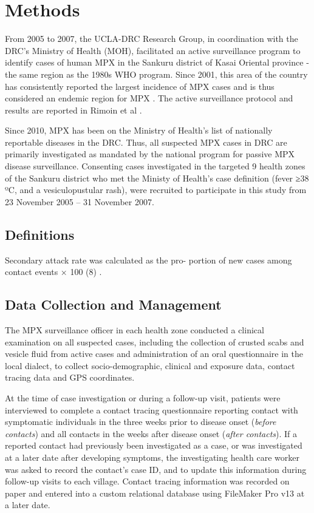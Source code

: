 \section{Methods}

From 2005 to 2007, the UCLA-DRC Research Group, in coordination with the DRC’s Ministry of Health (MOH), facilitated an active surveillance program to identify cases of human MPX in the Sankuru district of Kasai Oriental province - the same region as the 1980s WHO program. Since 2001, this area of the country has consistently reported the largest incidence of MPX cases and is thus considered an endemic region for MPX \cite{Rimoin2010}. The active surveillance protocol and results are reported in Rimoin et al \cite{Rimoin2010}.

Since 2010, MPX has been on the Ministry of Health's list of nationally reportable diseases in the DRC. Thus, all suspected MPX cases in DRC are primarily investigated as mandated by the national program for passive MPX disease surveillance. Consenting cases investigated in the targeted 9 health zones of the Sankuru district who met the  Ministy of Health’s case definition (fever ≥38 ºC, and a vesiculopustular rash), were recruited to participate in this study from 23 November 2005 – 31 November 2007. 

\subsection{Definitions}
Secondary attack rate was calculated as the pro- portion of new cases among contact events × 100 (8) \cite{Dixon2015}.

\subsection{Data Collection and Management}
The MPX surveillance officer in each health zone conducted a clinical examination on all suspected cases,
including the collection of crusted scabs and vesicle fluid from active cases and administration of an oral questionnaire in the local dialect, to collect socio-demographic, clinical and exposure data, contact tracing data and GPS coordinates.

At the time of case investigation or during a follow-up visit, patients were interviewed to complete a contact tracing questionnaire reporting contact with symptomatic individuals in the three weeks prior to disease onset  (\textit{before contacts}) and all contacts in the weeks after disease onset (\textit{after contacts}). If a reported contact had previously been investigated as a case, or was investigated at a later date after developing symptoms, the investigating health care worker was asked to record the contact's case ID, and to update this information during follow-up visits to each village. Contact tracing information was recorded on paper and entered into a custom relational database using FileMaker Pro v13 at a later date.

